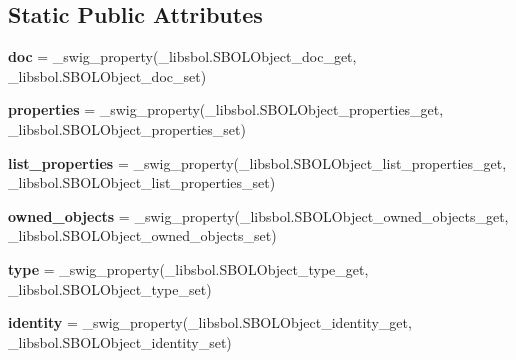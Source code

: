 \subsection*{Static Public Attributes}
\begin{DoxyCompactItemize}
\item 
{\bfseries doc} = \+\_\+swig\+\_\+property(\+\_\+libsbol.\+S\+B\+O\+L\+Object\+\_\+doc\+\_\+get, \+\_\+libsbol.\+S\+B\+O\+L\+Object\+\_\+doc\+\_\+set)\hypertarget{classsbol_1_1libsbol_1_1_s_b_o_l_object_a7418b65d987c1adc463a46557c4c46e5}{}\label{classsbol_1_1libsbol_1_1_s_b_o_l_object_a7418b65d987c1adc463a46557c4c46e5}

\item 
{\bfseries properties} = \+\_\+swig\+\_\+property(\+\_\+libsbol.\+S\+B\+O\+L\+Object\+\_\+properties\+\_\+get, \+\_\+libsbol.\+S\+B\+O\+L\+Object\+\_\+properties\+\_\+set)\hypertarget{classsbol_1_1libsbol_1_1_s_b_o_l_object_af01b08e5e017c7ac1411d89d2f1e50c6}{}\label{classsbol_1_1libsbol_1_1_s_b_o_l_object_af01b08e5e017c7ac1411d89d2f1e50c6}

\item 
{\bfseries list\+\_\+properties} = \+\_\+swig\+\_\+property(\+\_\+libsbol.\+S\+B\+O\+L\+Object\+\_\+list\+\_\+properties\+\_\+get, \+\_\+libsbol.\+S\+B\+O\+L\+Object\+\_\+list\+\_\+properties\+\_\+set)\hypertarget{classsbol_1_1libsbol_1_1_s_b_o_l_object_a4e87936f235fc46b948377b5af646965}{}\label{classsbol_1_1libsbol_1_1_s_b_o_l_object_a4e87936f235fc46b948377b5af646965}

\item 
{\bfseries owned\+\_\+objects} = \+\_\+swig\+\_\+property(\+\_\+libsbol.\+S\+B\+O\+L\+Object\+\_\+owned\+\_\+objects\+\_\+get, \+\_\+libsbol.\+S\+B\+O\+L\+Object\+\_\+owned\+\_\+objects\+\_\+set)\hypertarget{classsbol_1_1libsbol_1_1_s_b_o_l_object_abb757d2bee6cedc04161bd0d98ff6111}{}\label{classsbol_1_1libsbol_1_1_s_b_o_l_object_abb757d2bee6cedc04161bd0d98ff6111}

\item 
{\bfseries type} = \+\_\+swig\+\_\+property(\+\_\+libsbol.\+S\+B\+O\+L\+Object\+\_\+type\+\_\+get, \+\_\+libsbol.\+S\+B\+O\+L\+Object\+\_\+type\+\_\+set)\hypertarget{classsbol_1_1libsbol_1_1_s_b_o_l_object_a18c1b12529d576ccc2166e5673c14f52}{}\label{classsbol_1_1libsbol_1_1_s_b_o_l_object_a18c1b12529d576ccc2166e5673c14f52}

\item 
{\bfseries identity} = \+\_\+swig\+\_\+property(\+\_\+libsbol.\+S\+B\+O\+L\+Object\+\_\+identity\+\_\+get, \+\_\+libsbol.\+S\+B\+O\+L\+Object\+\_\+identity\+\_\+set)\hypertarget{classsbol_1_1libsbol_1_1_s_b_o_l_object_a19c8ed60369e5ec53e0a23b67c381d06}{}\label{classsbol_1_1libsbol_1_1_s_b_o_l_object_a19c8ed60369e5ec53e0a23b67c381d06}

\end{DoxyCompactItemize}


